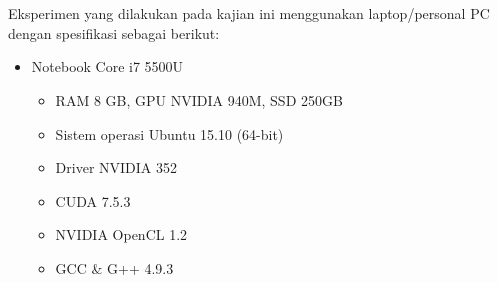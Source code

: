 \chapter{\lingkungan}

Eksperimen yang dilakukan pada kajian ini menggunakan laptop/personal PC dengan spesifikasi sebagai berikut:

\begin{itemize}
	\item Notebook Core i7 5500U
	\begin{itemize}
		\item RAM 8 GB, GPU NVIDIA 940M, SSD 250GB
		\item Sistem operasi Ubuntu 15.10 (64-bit)
		\item Driver NVIDIA 352
		\item CUDA 7.5.3
		\item NVIDIA OpenCL 1.2
		\item GCC \& G++ 4.9.3
	\end{itemize}
\end{itemize}